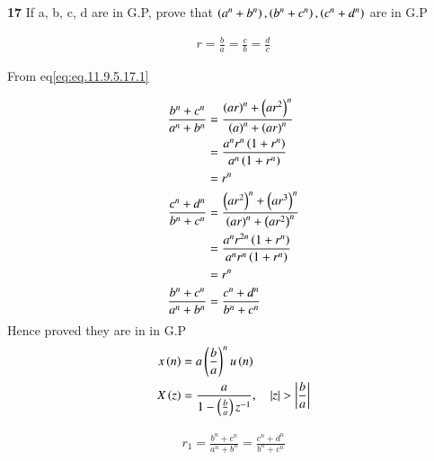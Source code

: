 \documentclass[journal,12pt,twocolumn]{IEEEtran}
\theoremstyle{remark}
\begin{document}


\vspace{3cm}

\title{}
\author{EE23BTECH11047 - Deepakreddy P
}
\maketitle
\newpage
\bigskip

\noindent \textbf{17} \quad 
If a, b, c, d are in G.P, prove that 
$ \left(a^{n} + b^{n}\right),\left(b^{n} + c^{n}\right),\left(c^{n} + d^{n}\right) $ are in G.P \\
\solution

\begin{center}
    \begin{table}[ht]
        
    \end{table}
\end{center}

\begin{align}   
r=\frac{b}{a} = \frac{c}{b}= \frac{d}{c} \label{eq:eq.11.9.5.17.1}
\end{align}

From eq\eqref{eq:eq.11.9.5.17.1}

\begin{align}
\frac{b^n + c^n}{a^n + b^n}
&= \frac{\left(ar\right)^n + \left(ar^2\right)^n}{\left(a\right)^n + \left(ar\right)^n}\\
&= \frac{a^n r^n \left(1+ r^n\right)}{a^n \left(1 + r^n\right)}\\
&= r^n \\
\frac{c^n + d^n}{b^n + c^n}&= \frac{\left(ar^2\right)^n + \left(ar^3\right)^n}{\left(ar\right)^n + \left(ar^2\right)^n}\\
&= \frac{a^n r^{2n} \left(1 + r^n\right)}{a^n r^n \left(1 + r^n\right)}\\
&= r^n \\
\frac{b^n + c^n}{a^n + b^n} &= \frac{c^n + d^n}{b^n + c^n}
\end{align}
Hence proved they are in in G.P\\

\begin{align}
    x\left(n\right) &= a\left(\frac{b}{a}\right)^{n} u\left(n\right)\\
    X\left(z\right) &= \frac{a}{1-\left(\frac{b}{a}\right) z^{-1}}, \quad \left\vert z\right\vert>\left\vert\frac{b}{a}\right\vert
\end{align}

\begin{align}   
r_1=\frac{b^n + c^n}{a^n + b^n} = \frac{c^n + d^n}{b^n + c^n} \label{eq:eq.11.9.5.17.2}
\end{align}
\end{document}

